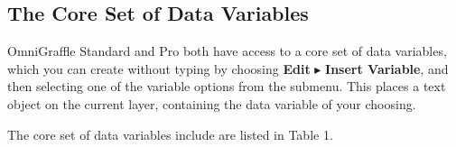 \documentclass[../main.tex]{subfiles}
\begin{document}

\subsection{The Core Set of Data Variables}

OmniGraffle Standard and Pro both have access to a core set of data variables, which you can
create without typing by choosing \textbf{Edit} $\blacktriangleright$ \textbf{Insert
Variable}, and then selecting one of the variable options from the submenu. This places a text
object on the current layer, containing the data variable of your choosing.

The core set of data variables include are listed in Table 1.

\begingroup
\small
\setlength{\LTleft}{0.075\textwidth}
\setlength{\LTright}{0.075\textwidth}
\renewcommand{\arraystretch}{1.25}
\end{document}
